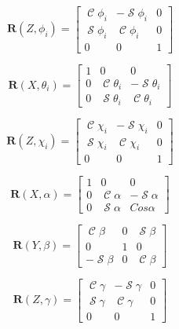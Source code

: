 \documentclass[titlepage, letterpaper, fleqn]{article}
\DeclareMathOperator{\cose}{\mathcal{C}}
\DeclareMathOperator{\sen}{\mathcal{S}}
\begin{document}
\begin{equation}
    \label{eq:rot_Zphi}
    \mathbf{R}(Z,\phi_i) =
    \begin{bmatrix}
        \cose\phi_i & -\sen\phi_i & 0 \\
        \sen\phi_i & \cose\phi_i & 0 \\
        0 & 0 & 1
    \end{bmatrix}
\end{equation}

\begin{equation}
    \label{eq:rot_Xtheta}
    \mathbf{R}(X,\theta_i) =
    \begin{bmatrix}
        1 & 0 & 0 \\
        0 & \cose\theta_{i} & -\sen\theta_{i} \\
        0 & \sen\theta_{i} & \cose\theta_{i}
    \end{bmatrix}
\end{equation}

\begin{equation}
    \label{eq:rot_Zchi}
    \mathbf{R}(Z,\chi_i) =
    \begin{bmatrix}
    \cose\chi_i & -\sen\chi_i & 0 \\
    \sen\chi_i & \cose\chi_i & 0 \\
    0 & 0 & 1
    \end{bmatrix}
\end{equation}

\begin{equation}
    \label{eq:rot_Xalpha}
    \mathbf{R}(X,\alpha) = 
    \begin{bmatrix}
    1 & 0 & 0 \\
    0 & \cose\alpha & -\sen \alpha \\
    0 & \sen\alpha & Cos \alpha
    \end{bmatrix}
\end{equation}

\begin{equation}
    \label{eq:rot_Ybeta}
    \mathbf{R}(Y,\beta) =
    \begin{bmatrix}
        \cose\beta & 0 & \sen\beta \\
        0 & 1 & 0 \\
        -\sen\beta & 0 &\cose\beta
    \end{bmatrix}
\end{equation}

\begin{equation}
    \label{eq:rot_Xgamma}
    \mathbf{R}(Z,\gamma) =
    \begin{bmatrix}
        \cose\gamma & -\sen\gamma & 0 \\
        \sen\gamma & \cose\gamma & 0 \\
        0 & 0 & 1
    \end{bmatrix}
\end{equation}
\end{document}
